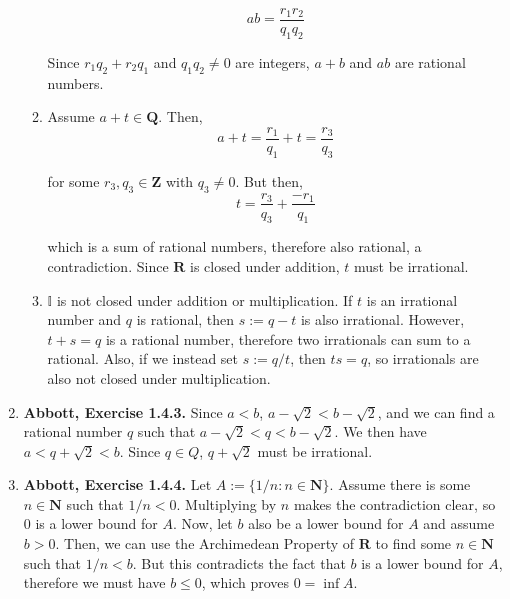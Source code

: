 \documentclass{article}
\newcommand{\N}{\mathbf{N}}
\newcommand{\Z}{\mathbf{Z}}
\newcommand{\Q}{\mathbf{Q}}
\newcommand{\R}{\mathbf{R}}
\newcommand{\exc}[2][Abbott]{\item \textbf{#1, Exercise #2.}}
\begin{document}
\begin{enumerate}
\begin{enumerate}
		\begin{equation*}
			ab = \frac{r_1 r_2}{q_1 q_2}
		\end{equation*}
							      		      	      
		Since $r_1 q_2 + r_2 q_1$ and $q_1 q_2 \neq 0$ are integers, $a+b$ and $ab$ are rational numbers.
							      		      	      
		\item Assume $a + t \in \Q$. Then, 
		      \begin{equation*}
		      	a + t = \frac{r_1}{q_1} + t = \frac{r_3}{q_3}
		      \end{equation*}
		      		      		      	      	      	      	            
		      for some $r_3, q_3 \in \Z$ with $q_3 \neq 0$. But then,
		      \begin{equation*}
		      	t = \frac{r_3}{q_3} +  \frac{-r_1}{q_1}
		      \end{equation*}
		      		      		      	      	      	      	            
		      which is a sum of rational numbers, therefore also rational, a contradiction. Since $\R$ is closed under addition, $t$ must be irrational.
		      		      		      	      	      	      	            
		\item $\mathbb{I}$ is not closed under addition or multiplication. If $t$ is an irrational number and $q$ is rational, then $s := q-t$ is also irrational. However, $t + s = q$ is a rational number, therefore two irrationals can sum to a rational. Also, if we instead set $s := q/t$, then $t s = q$, so irrationals are also not closed under multiplication.
	\end{enumerate}
				      	        
	\exc{1.4.3}
	Since $a < b$, $a - \sqrt{2} < b - \sqrt{2}$, and we can find a rational number $q$ such that $a - \sqrt{2} < q < b - \sqrt{2}$. We then have $a < q + \sqrt{2} < b$. Since $q \in Q$, $q + \sqrt{2}$ must be irrational.
				      	      
	\exc{1.4.4}
	Let $A := \{1/n : n \in \N\}$.
	Assume there is some $n \in \N$ such that $1/n < 0$. Multiplying by $n$ makes the contradiction clear, so $0$ is a lower bound for $A$. Now, let $b$  also be a lower bound for $A$ and assume $b > 0$. Then, we can use the Archimedean Property of $\R$ to find some $n \in \N$ such that $1/n < b$. But this contradicts the fact that $b$ is a lower bound for $A$, therefore we must have $b \leq 0$, which proves $0 = \inf A$.
				      	        

\end{enumerate}
\end{document}
